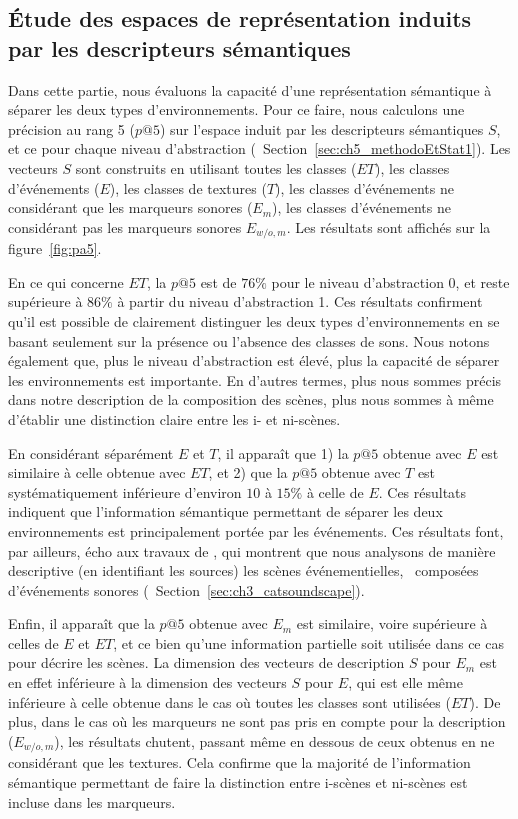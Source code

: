 \subsection{Étude des espaces de représentation induits par les descripteurs sémantiques}

Dans cette partie, nous évaluons la capacité d'une représentation sémantique à séparer les deux types d'environnements. Pour ce faire, nous calculons une précision au rang 5 ($p@5$) sur l'espace induit par les descripteurs sémantiques $S$, et ce pour chaque niveau d'abstraction (\cf~Section~\ref{sec:ch5_methodoEtStat1}). Les vecteurs $S$ sont construits en utilisant toutes les classes ($ET$), les classes d'événements ($E$), les classes de textures ($T$), les classes d'événements ne considérant que les marqueurs sonores ($E_m$), les classes d'événements ne considérant pas les marqueurs sonores $E_{w/o,m}$. Les résultats sont affichés sur la figure~\ref{fig:pa5}.

En ce qui concerne $ET$, la $p@5$ est de $76\%$ pour le niveau d'abstraction 0, et reste supérieure à $86\%$ à partir du niveau d'abstraction 1. Ces résultats confirment qu'il est possible de clairement distinguer les deux types d'environnements en se basant seulement sur la présence ou l'absence des classes de sons. Nous notons également que, plus le niveau d'abstraction est élevé, plus la capacité de séparer les environnements est importante. En d'autres termes, plus nous sommes précis dans notre description de la composition des scènes, plus nous sommes à même d'établir une distinction claire entre les i- et ni-scènes.

En considérant séparément $E$ et $T$, il apparaît que 1) la $p@5$ obtenue avec $E$ est similaire à celle obtenue avec $ET$, et 2) que la $p@5$ obtenue avec $T$ est systématiquement inférieure d'environ $10$ à $15\%$ à celle de $E$. Ces résultats indiquent que l'information sémantique permettant de séparer les deux environnements est principalement portée par les événements. Ces résultats font, par ailleurs, écho aux travaux de  \citep{maffiolo_caracterisation_1999}, qui montrent que nous analysons de manière descriptive (en identifiant les sources) les scènes événementielles, \ie~composées d'événements sonores (\cf~Section~\ref{sec:ch3_catsoundscape}).

Enfin, il apparaît que la $p@5$ obtenue avec $E_{m}$ est similaire, voire supérieure à celles de $E$ et $ET$, et ce bien qu'une information partielle soit utilisée dans ce cas pour décrire les scènes. La dimension des vecteurs de description $S$ pour $E_m$ est en effet inférieure à la dimension des vecteurs $S$ pour $E$, qui est elle même inférieure à celle obtenue dans le cas où toutes les classes sont utilisées ($ET$). De plus, dans le cas où les marqueurs ne sont pas pris en compte pour la description ($E_{w/o,m}$), les résultats chutent, passant même en dessous de ceux obtenus en ne considérant que les textures. Cela confirme que la majorité de l'information sémantique permettant de faire la distinction entre i-scènes et ni-scènes est incluse dans les marqueurs.

